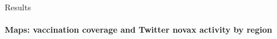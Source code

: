 \documentclass[9pt]{beamer}
\begin{document}
\begin{frame}{Results}
\framesubtitle{Maps: vaccination coverage and Twitter novax activity by region}
	\begin{figure}
	\begin{minipage}[c]{0.48\linewidth}
	\centering
	\end{minipage}
	\begin{minipage}[]{0.48\linewidth}
	\centering

\end{minipage}
\end{figure}
\end{frame}
\end{document}
